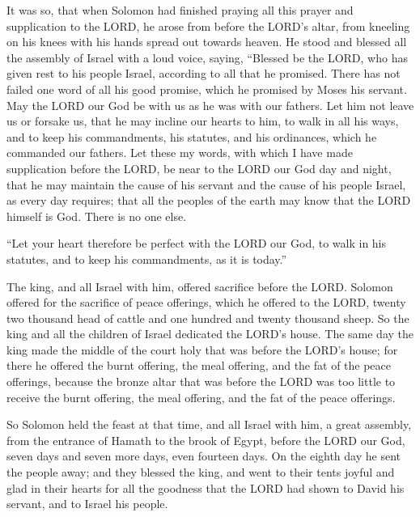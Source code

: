  It was so, that when Solomon had finished praying all
this prayer and supplication to the LORD, he arose from before the
LORD's altar, from kneeling on his knees with his hands spread out
towards heaven.  He stood and blessed all the assembly of
Israel with a loud voice, saying,  ``Blessed be the LORD,
who has given rest to his people Israel, according to all that he
promised. There has not failed one word of all his good promise, which
he promised by Moses his servant.  May the LORD our God
be with us as he was with our fathers. Let him not leave us or forsake
us,  that he may incline our hearts to him, to walk in
all his ways, and to keep his commandments, his statutes, and his
ordinances, which he commanded our fathers.  Let these my
words, with which I have made supplication before the LORD, be near to
the LORD our God day and night, that he may maintain the cause of his
servant and the cause of his people Israel, as every day requires;
 that all the peoples of the earth may know that the LORD
himself is God. There is no one else.

 ``Let your heart therefore be perfect with the LORD our
God, to walk in his statutes, and to keep his commandments, as it is
today.''

 The king, and all Israel with him, offered sacrifice
before the LORD.  Solomon offered for the sacrifice of
peace offerings, which he offered to the LORD, twenty two thousand head
of cattle and one hundred and twenty thousand sheep. So the king and all
the children of Israel dedicated the LORD's house.  The
same day the king made the middle of the court holy that was before the
LORD's house; for there he offered the burnt offering, the meal
offering, and the fat of the peace offerings, because the bronze altar
that was before the LORD was too little to receive the burnt offering,
the meal offering, and the fat of the peace offerings.

 So Solomon held the feast at that time, and all Israel
with him, a great assembly, from the entrance of Hamath to the brook of
Egypt, before the LORD our God, seven days and seven more days, even
fourteen days.  On the eighth day he sent the people
away; and they blessed the king, and went to their tents joyful and glad
in their hearts for all the goodness that the LORD had shown to David
his servant, and to Israel his people.

